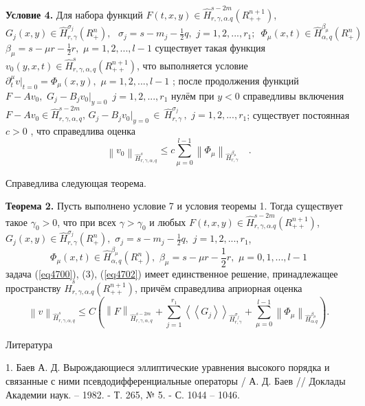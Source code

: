 \textbf{Условие 4. }Для набора функций $F(t,x,y) \in \hat {H}_{r,\gamma
,\alpha .q}^{s - 2m} (R_{ + + }^{n + 1} )$, $G_j (x,y) \in \hat
{H}_{r,\gamma }^{\sigma _j } (R_ + ^n ),\,\,\,\,\sigma _j = s - m_j -
\frac{1}{2}q,\,\,j = 1,2,...,r_1 ;\,\,\,\Phi _\mu (x,t) \in \hat {H}_{\alpha
,q}^{\beta _\mu } (R_ + ^n )$
$\beta _\mu = s - \mu r - \frac{1}{2}r,\,\,\mu = 1,2,...,l -1$
существует такая функция
$v_0 (y,x,t) \in \hat {H}_{r,\gamma ,\alpha ,q}^s (R_{ + + }^{n + 1}
)$,
что
выполняется условие $\partial _t^\mu \left. v \right|_{t = 0} = \Phi _\mu
(x,y),\,\,\mu = 1,2,...,l - 1$ ;
после продолжения функций $F - Av_0 ,\,\,G_j - B_j v_0 \vert _{y = 0}
\,\,\,j = 1,2,...,r_1 $ нулём при $y < 0$ справедливы включения $F - Av_0 \in
\hat {H}_{r,\gamma ,\alpha ,q}^{s - 2m} ,\,G_j - B_j v_0 \vert _{y = 0} \,
\in \,\hat {H}_{r,\gamma }^{\sigma _j } \,,\,\,j = 1,2,...,r_1 $;
существует постоянная $c > 0$ , что справедлива оценка
\[
\left\| {v_0 } \right\|_{\hat {H}_{r,\gamma ,\alpha ,q}^s } \le
c\sum\limits_{\mu = 0}^{l - 1} {\left\| {\Phi _\mu } \right\|} _{\hat
{H}_{r,\gamma }^{\beta _\mu } } \quad .
\]







Справедлива следующая теорема.

\textbf{Теорема 2. }Пусть выполнено условие 7 и условия теоремы 1. Тогда
существует такое $\gamma _0 > 0$, что при всех $\gamma > \gamma _0 $ и любых
$F(t,x,y) \in \hat {H}_{r,\gamma ,\alpha .q}^{s - 2m} (R_{ + + }^{n + 1} )$,
$G_j (x,y) \in \hat {H}_{r,\gamma }^{\sigma _j } (R_ + ^n ),\,\,\sigma _j =
s - m_j - \frac{1}{2}q,\,\,j = 1,2,...,r_1 $,
\[
\Phi _\mu (x,t) \in \hat {H}_{\alpha ,q}^{\beta _\mu } (R_ + ^n ),\,\,\beta
_\mu = s - \mu r - \frac{1}{2}r,\,\,\mu = 0,1,...,l - 1
\]
задача (\ref{eq4700}), (3), (\ref{eq4702}) имеет единственное решение, принадлежащее пространству
$\hat {H}_{r,\gamma ,\alpha .q}^s (R_{ + + }^{n + 1} )$, причём справедлива
априорная оценка
\[
\left\| v \right\|_{\hat {H}_{r,\gamma ,\alpha ,q}^s } \le C(\left\| F
\right\|_{\hat {H}_{r,\gamma ,\alpha ,q}^{s - 2m} } + \sum\limits_{j =
1}^{r_1 } {\left\langle {\left\langle {G_j } \right\rangle } \right\rangle }
_{\hat {H}_{r,\gamma }^{\sigma _j } } + \sum\limits_{\mu = 0}^{l - 1}
{\left\| {\Phi _\mu } \right\|} _{\hat {H}_{\alpha .q}^{\beta _\mu } } ) .
\]



Литература

1. Баев А. Д. Вырождающиеся эллиптические уравнения высокого порядка и
связанные с ними псевдодифференциальные операторы / А. Д. Баев // Доклады
Академии наук. -- 1982. - Т. 265, № 5. - С. 1044 -- 1046.

